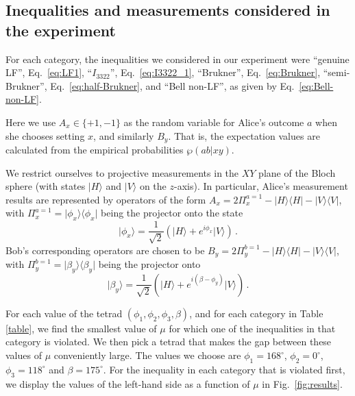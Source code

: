\documentclass[aps,prx,twocolumn,superscriptaddress]{revtex4-1}
\theoremstyle{plain}
\newcommand{\ket}[1]{\ensuremath{|{#1}\rangle}}
\newcommand{\bra}[1]{\ensuremath{\langle{#1}|}}
\begin{document}
\subsection{Inequalities and measurements considered in the experiment}

For each category, the inequalities we considered in our experiment were
``genuine LF'', Eq.~\eqref{eq:LF1}, ``$I_{3322}$'', Eq.~\eqref{eq:I3322_1}, 
``Brukner'', Eq.~\eqref{eq:Brukner}, ``semi-Brukner'', Eq.~\eqref{eq:half-Brukner}, and ``Bell non-LF'', as given by Eq.~\eqref{eq:Bell-non-LF}.

Here we use $A_x\in \{+1,-1\}$ as the random variable for Alice's outcome $a$ when she chooses setting $x$, and similarly $B_y$. That is, the expectation values are calculated from the empirical probabilities $\wp(ab|xy)$.

 We restrict ourselves to projective measurements in the $XY$ plane of the Bloch sphere (with states $\ket{H}$ and $\ket{V}$ on the $z$-axis). In particular, Alice's measurement results are represented by operators of the form $A_x = 2\Pi_x^{a=1} -\ket{H}\bra{H}-\ket{V}\bra{V}$, with $\Pi^{a=1}_x=\ket{\phi_x}\bra{\phi_x}$ being the projector onto the state
\begin{equation}
    \ket{\phi_x} =\frac{1}{\sqrt{2}}\left(\ket{H} + e^{i\phi_x}\ket{V}\right)\,.
\end{equation}
Bob's corresponding operators are chosen to be $B_y = 2\Pi^{b=1}_y-\ket{H}\bra{H}-\ket{V}\bra{V}$, with $\Pi^{b=1}_ y=\ket{\beta_y}\bra{\beta_y}$ being the projector onto
\begin{equation}
    \ket{\beta_y} = \frac{1}{\sqrt{2}}\left(\ket{H} + e^{i(\beta-\phi_{y})}\ket{V}\right)\,.
\end{equation}

 For each value of the tetrad $(\phi_1, \phi_2, \phi_3, \beta)$, and for each category in Table \ref{table}, we find the smallest value of $\mu$ for which one of the inequalities in that category is violated. We then pick a tetrad that makes the gap between these values of $\mu$ conveniently large. The values we choose are $\phi_1=168^\circ$, $\phi_2=0^\circ$, $\phi_3=118^\circ$ and $\beta=175^\circ$. For the inequality in each category that is violated first, we display the values of the left-hand side as a function of $\mu$ in Fig.~\ref{fig:results}. 
\end{document}

